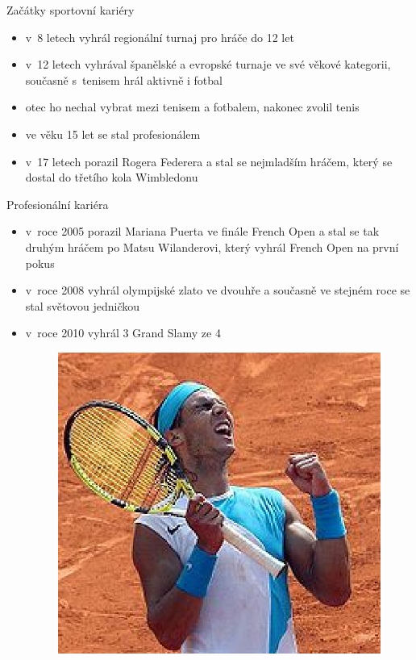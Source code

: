 \documentclass[pdf,slideColor,azure]{prosper}
\begin{document}
\begin{slide}{Začátky sportovní kariéry}
\begin{itemize}
\item v~8 letech vyhrál regionální turnaj pro hráče do 12 let
\item v~12 letech vyhrával španělské a evropské turnaje ve své věkové kategorii, současně s~tenisem hrál aktivně i fotbal
\item otec ho nechal vybrat mezi tenisem a fotbalem, nakonec zvolil tenis
\item ve věku 15 let se stal profesionálem
\item v~17 letech porazil Rogera Federera a stal se nejmladším hráčem, který se dostal do třetího kola Wimbledonu
\end{itemize}
\end{slide}

\begin{slide}{Profesionální kariéra}
\begin{itemize}
\item v~roce 2005 porazil Mariana Puerta ve finále French Open a stal se tak druhým hráčem po Matsu Wilanderovi, který vyhrál French Open na první pokus
\item v~roce 2008 vyhrál olympijské zlato ve dvouhře a současně ve stejném roce se stal světovou jedničkou
\item v~roce 2010 vyhrál 3 Grand Slamy ze 4
\begin{figure}
\centering
\includegraphics[scale=0.4]{obr2.eps}
\end{figure}
\end{itemize}
\end{slide}
\end{document}
